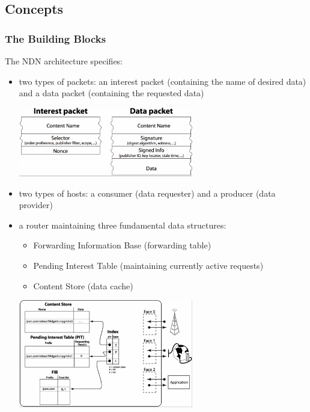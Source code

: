         \subsection{Concepts}
            \subsubsection{The Building Blocks}
                The NDN architecture specifies:
                    \begin{itemize}
                        \item two types of packets: an interest packet (containing the name of desired data) and a data packet (containing the requested data)
                    \begin{center}\includegraphics[width=0.6\textwidth]{media/ndn_packets1.png}\end{center}
                        \item two types of hosts: a consumer (data requester) and a producer (data provider)
                        \item a router maintaining three fundamental data structures:
                        \begin{itemize}
                            \item Forwarding Information Base (forwarding table)
                            \item Pending Interest Table (maintaining currently active requests)
                            \item Content Store (data cache)
                        \end{itemize}
                        \begin{center}\includegraphics[width=0.6\textwidth]{media/ndn_router1.png}\end{center}

                    \end{itemize}

